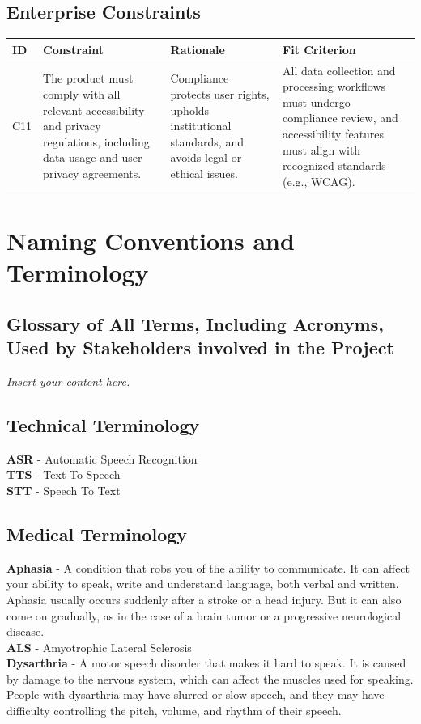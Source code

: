 \documentclass[11pt]{article}
\newcommand{\lips}{\textit{Insert your content here.}}
\begin{document}
\subsection{Enterprise Constraints}

\begin{tabularx}{\textwidth}{p{1cm}X X X}
\toprule
\textbf{ID} & \textbf{Constraint} & \textbf{Rationale} & \textbf{Fit Criterion} \\
\midrule
C11 & The product must comply with all relevant accessibility and privacy regulations, including data usage and user privacy agreements. & Compliance protects user rights, upholds institutional standards, and avoids legal or ethical issues. & All data collection and processing workflows must undergo compliance review, and accessibility features must align with recognized standards (e.g., WCAG). \\
\bottomrule
\end{tabularx}

\section{Naming Conventions and Terminology}
\subsection{Glossary of All Terms, Including Acronyms, Used by Stakeholders
involved in the Project}

\lips

\subsection{Technical Terminology}
\textbf{ASR} - Automatic Speech Recognition \\
\textbf{TTS} - Text To Speech \\
\textbf{STT} - Speech To Text \\


\subsection{Medical Terminology}
\textbf{Aphasia} - A condition that robs you of the ability to communicate. It can affect your ability to speak, write and understand language, both verbal and written. Aphasia usually occurs suddenly after a stroke or a head injury. But it can also come on gradually, as in the case of a brain tumor or a progressive neurological disease. \\
\textbf{ALS} - Amyotrophic Lateral Sclerosis \\
\textbf{Dysarthria} - A motor speech disorder that makes it hard to speak. It is caused by damage to the nervous system, which can affect the muscles used for speaking. People with dysarthria may have slurred or slow speech, and they may have difficulty controlling the pitch, volume, and rhythm of their speech. \\
\end{document}
